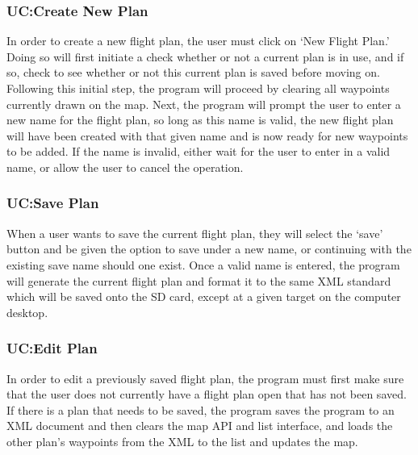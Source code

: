 \documentclass[12pt, letterpaper]{article}
\begin{document}
\clearpage
\subsubsection{UC:Create New Plan}
In order to create a new flight plan, the user must click on `New Flight Plan.'
Doing so will first initiate a check whether or not a current plan is in use, and if so, check to see whether or not this current plan is saved before moving on.
Following this initial step, the program will proceed by clearing all waypoints currently drawn on the map.
Next, the program will prompt the user to enter a new name for the flight plan, so long as this name is valid, the new flight plan will have been created with that given name and is now ready for new waypoints to be added.
If the name is invalid, either wait for the user to enter in a valid name, or allow the user to cancel the operation.

\clearpage
\subsubsection{UC:Save Plan}
When a user wants to save the current flight plan, they will select the `save' button and be given the option to save under a new name, or continuing with the existing save name should one exist.
Once a valid name is entered, the program will generate the current flight plan and format it to the same XML standard which will be saved onto the SD card, except at a given target on the computer desktop.

\clearpage
\subsubsection{UC:Edit Plan}
In order to edit a previously saved flight plan, the program must first make sure that the user does not currently have a flight plan open that has not been saved.
If there is a plan that needs to be saved, the program saves the program to an XML document and then clears the map API and list interface, and loads the other plan’s waypoints from the XML to the list and updates the map.

\clearpage
\end{document}
